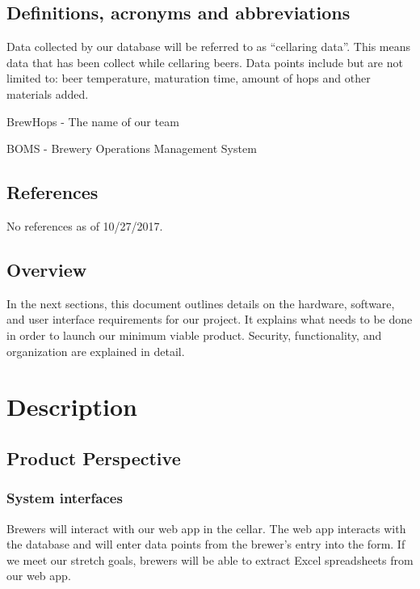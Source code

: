 \documentclass[draftclsnofoot,onecolumn,letterpaper,10pt,compsoc]{IEEEtran}
\begin{document}
	\subsection{Definitions, acronyms and abbreviations}
		Data collected by our database will be referred to as “cellaring data”.
		This means data that has been collect while cellaring beers.
		Data points include but are not limited to: beer temperature, maturation time, amount of hops and other materials added.

		BrewHops - The name of our team

		BOMS - Brewery Operations Management System


	\subsection{References}
    No references as of 10/27/2017.
	\subsection{Overview}
		In the next sections, this document outlines details on the hardware, software, and user interface requirements for our project.
		It explains what needs to be done in order to launch our minimum viable product.
		Security, functionality, and organization are explained in detail.

\section{Description}
	\subsection{Product Perspective}
		\subsubsection{System interfaces}
			Brewers will interact with our web app in the cellar.
			The web app interacts with the database and will enter data points from the brewer's entry into the form.
			If we meet our stretch goals, brewers will be able to extract Excel spreadsheets from our web app.
\end{document}
